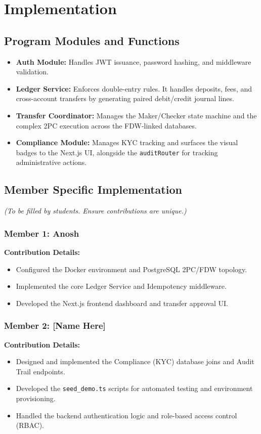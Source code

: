 \chapter{Implementation}

\section{Program Modules and Functions}
\begin{itemize}
    \item \textbf{Auth Module:} Handles JWT issuance, password hashing, and middleware validation.
    \item \textbf{Ledger Service:} Enforces double-entry rules. It handles deposits, fees, and cross-account transfers by generating paired debit/credit journal lines.
    \item \textbf{Transfer Coordinator:} Manages the Maker/Checker state machine and the complex 2PC execution across the FDW-linked databases.
    \item \textbf{Compliance Module:} Manages KYC tracking and surfaces the visual badges to the Next.js UI, alongside the \texttt{auditRouter} for tracking administrative actions.
\end{itemize}

\section{Member Specific Implementation}
\textit{(To be filled by students. Ensure contributions are unique.)}

\subsection{Member 1: Anosh}
\textbf{Contribution Details:} 
\begin{itemize}
    \item Configured the Docker environment and PostgreSQL 2PC/FDW topology.
    \item Implemented the core Ledger Service and Idempotency middleware.
    \item Developed the Next.js frontend dashboard and transfer approval UI.
\end{itemize}

\subsection{Member 2: [Name Here]}
\textbf{Contribution Details:}
\begin{itemize}
    \item Designed and implemented the Compliance (KYC) database joins and Audit Trail endpoints.
    \item Developed the \texttt{seed\_demo.ts} scripts for automated testing and environment provisioning.
    \item Handled the backend authentication logic and role-based access control (RBAC).
\end{itemize}

